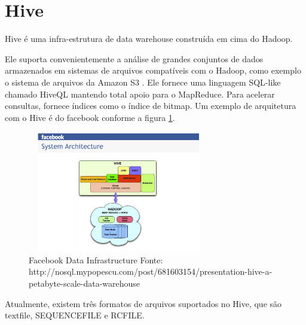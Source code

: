 \section{\textbf{Hive}}
Hive \cite{hive} é uma infra-estrutura de data warehouse construída em cima do
Hadoop. 

Ele suporta convenientemente a análise de grandes conjuntos de dados armazenados
em sistemas de arquivos compatíveis com o Hadoop,  como exemplo o sistema de
arquivos  da Amazon S3 \cite{amazon}. Ele fornece uma linguagem SQL-like chamado HiveQL
mantendo total apoio para o MapReduce. Para acelerar consultas, fornece índices
como o índice de bitmap. Um exemplo de arquitetura com o Hive é do facebook
conforme a figura \ref{hive}.

\begin{figure}[ht]
  \centering
  \includegraphics[width=300px,height=200px]{img/hive2.png}
  \caption{Facebook Data Infrastructure\newline
  Fonte: http://nosql.mypopescu.com/post/681603154/presentation-hive-a-petabyte-scale-data-warehouse}
  \label{hive}
\end{figure}
 
Atualmente, existem três formatos de arquivos suportados no Hive, que são
textfile, SEQUENCEFILE e RCFILE.


